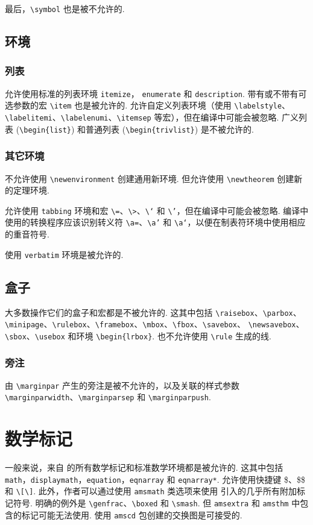 \documentclass[twocolumn, amssymb, bibnotes, aps, prd, 10pt]{revtex4-2}
\newcommand{\classoption}[1]{\texttt{#1}}
\newcommand{\macro}[1]{\texttt{\textbackslash#1}}
\newcommand{\m}[1]{\macro{#1}}
\newcommand{\env}[1]{\texttt{#1}}
\begin{document}
最后，\m{symbol} 也是被不允许的.

\subsection{环境}
\subsubsection{列表}
允许使用标准的列表环境 \env{itemize}， \env{enumerate} 和 \env{description}. 带有或不带有可选参数的宏 \m{item} 也是被允许的. 允许自定义列表环境（使用 \m{labelstyle}、\m{labelitemi}、\m{labelenumi}、\m{itemsep} 等宏），但在编译中可能会被忽略. 广义列表 (\m{begin\{list\}}) 和普通列表 (\m{begin\{trivlist\}}) 是不被允许的.

\subsubsection{其它环境}
不允许使用 \m{newenvironment} 创建通用新环境. 但允许使用 \m{newtheorem} 创建新的定理环境.

允许使用 \env{tabbing} 环境和宏 \m{=}、\m{>}、\m{`} 和 \m{'}，但在编译中可能会被忽略. 编译中使用的转换程序应该识别转义符 \m{a=}、\m{a'} 和 \m{a`}，以便在制表符环境中使用相应的重音符号.

使用 \env{verbatim} 环境是被允许的.

\subsection{盒子}
大多数操作它们的盒子和宏都是不被允许的. 这其中包括 \m{raisebox}、\m{parbox}、\m{minipage}、\m{rulebox}、\m{framebox}、\m{mbox}、\m{fbox}、\m{savebox}、 \m{newsavebox}、\m{sbox}、\m{usebox} 和环境 \m{begin\{lrbox\}}. 也不允许使用 \m{rule} 生成的线.

\subsubsection{旁注}
由 \m{marginpar} 产生的旁注是被不允许的，以及关联的样式参数 \m{marginparwidth}、\m{marginparsep} 和
\m{marginparpush}.


\section{数学标记}

一般来说，来自 {} 的所有数学标记和标准数学环境都是被允许的. 这其中包括 \env{math}，\env{displaymath}，\env{equation}，\env{eqnarray} 和 \env{eqnarray*}. 允许使用快捷键 \$、\$\$ 和 \verb|\[\]|. 此外，作者可以通过使用 \classoption{amsmath} 类选项来使用  引入的几乎所有附加标记符号. 明确的例外是 \m{genfrac}、\m{boxed} 和 \m{smash}. 但 \texttt{amsextra} 和 \texttt{amsthm} 中包含的标记可能无法使用. 使用 \texttt{amscd} 包创建的交换图是可接受的.
\end{document}
